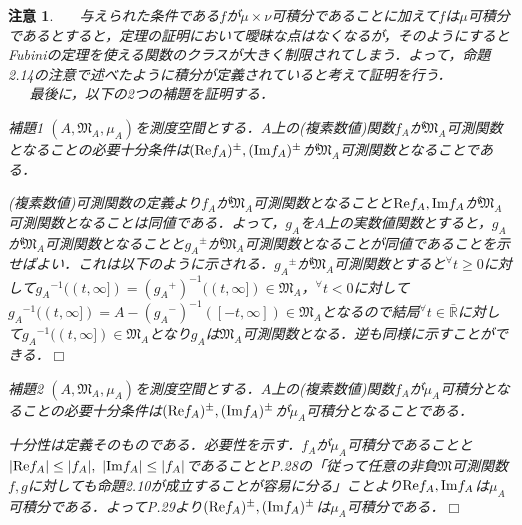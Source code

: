 \documentclass[a4paper,11pt]{jsarticle}
\def\qed{\hfill $\Box$}
\newtheorem{attention}{注意}
\begin{document}
\begin{attention}
{{\ }{\ }{\ }与えられた条件である$f$が$\mu\times\nu$可積分であることに加えて$f$は$\mu$可積分であるとすると，定理の証明において曖昧な点はなくなるが，そのようにするとFubiniの定理を使える関数のクラスが大きく制限されてしまう．よって，命題2.14の注意で述べたように積分が定義されていると考えて証明を行う．}\\
{\ }{\ }{\ }最後に，以下の2つの補題を証明する．
\begin{itembox}[l]{補題1}
$(A,\mathfrak{M}_A,\mu_A)$を測度空間とする．$A$上の(複素数値)関数$f_A$が$\mathfrak{M}_A$可測関数となることの必要十分条件は$({\rm Re}f_A)^\pm,({\rm Im}f_A)^\pm$が$\mathfrak{M}_A$可測関数となることである．
\end{itembox}
(複素数値)可測関数の定義より$f_A$が$\mathfrak{M}_A$可測関数となることと${\rm Re}f_A,{\rm Im}f_A$が$\mathfrak{M}_A$可測関数となることは同値である．よって，$g_A$を$A$上の実数値関数とすると，$g_A$が$\mathfrak{M}_A$可測関数となることと${g_A}^\pm$が$\mathfrak{M}_A$可測関数となることが同値であることを示せばよい．これは以下のように示される．${g_A}^\pm$が$\mathfrak{M}_A$可測関数とすると$^\forall t\geq 0$に対して${g_A}^{-1}((t,\infty])=({g_A}^+)^{-1}((t,\infty])\in \mathfrak{M}_A$，$^\forall t< 0$に対して${g_A}^{-1}((t,\infty])=A-({g_A}^-)^{-1}([-t,\infty])\in \mathfrak{M}_A$となるので結局$^\forall t\in \bar{\mathbb{R}}$に対して${g_A}^{-1}((t,\infty])\in \mathfrak{M}_A$となり$g_A$は$\mathfrak{M}_A$可測関数となる．逆も同様に示すことができる．\qed
\begin{itembox}[l]{補題2}
$(A,\mathfrak{M}_A,\mu_A)$を測度空間とする．$A$上の(複素数値)関数$f_A$が$\mu_A$可積分となることの必要十分条件は$({\rm Re}f_A)^\pm,({\rm Im}f_A)^\pm$が$\mu_A$可積分となることである．
\end{itembox}
十分性は定義そのものである．必要性を示す．$f_A$が$\mu_A$可積分であることと$|{\rm Re}f_A|\leq |f_A|,{\ }|{\rm Im}f_A|\leq |f_A|$であることとP.28の「従って任意の非負$\mathfrak{M}$可測関数$f,g$に対しても命題2.10が成立することが容易に分る」ことより${\rm Re}f_A,{\rm Im}f_A$は$\mu_A$可積分である．よってP.29より$({\rm Re}f_A)^\pm,({\rm Im}f_A)^\pm$は$\mu_A$可積分である．\qed
\end{attention}
\end{document}
